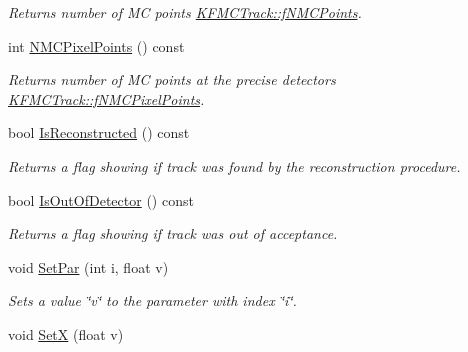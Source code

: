 \begin{DoxyCompactItemize}
\begin{DoxyCompactList}\small\item\em Returns number of MC points \hyperlink{classKFMCTrack_ac261323b51266d63d1bb6335e8428600}{K\+F\+M\+C\+Track\+::f\+N\+M\+C\+Points}. \end{DoxyCompactList}\item 
int \hyperlink{classKFMCTrack_a7ee66bc8a0c3db8f3adc6db3c28ae754}{N\+M\+C\+Pixel\+Points} () const \hypertarget{classKFMCTrack_a7ee66bc8a0c3db8f3adc6db3c28ae754}{}\label{classKFMCTrack_a7ee66bc8a0c3db8f3adc6db3c28ae754}

\begin{DoxyCompactList}\small\item\em Returns number of MC points at the precise detectors \hyperlink{classKFMCTrack_a7e91b033a3f0856258c0906ed5bcb293}{K\+F\+M\+C\+Track\+::f\+N\+M\+C\+Pixel\+Points}. \end{DoxyCompactList}\item 
bool \hyperlink{classKFMCTrack_a48f50e99c1ee75e0f800457528fe50aa}{Is\+Reconstructed} () const \hypertarget{classKFMCTrack_a48f50e99c1ee75e0f800457528fe50aa}{}\label{classKFMCTrack_a48f50e99c1ee75e0f800457528fe50aa}

\begin{DoxyCompactList}\small\item\em Returns a flag showing if track was found by the reconstruction procedure. \end{DoxyCompactList}\item 
bool \hyperlink{classKFMCTrack_a1269c7bd6cd60539a825e3b5a47e3d0f}{Is\+Out\+Of\+Detector} () const \hypertarget{classKFMCTrack_a1269c7bd6cd60539a825e3b5a47e3d0f}{}\label{classKFMCTrack_a1269c7bd6cd60539a825e3b5a47e3d0f}

\begin{DoxyCompactList}\small\item\em Returns a flag showing if track was out of acceptance. \end{DoxyCompactList}\item 
void \hyperlink{classKFMCTrack_adaf79bfed6d62b84dfcf47ccad7a3f44}{Set\+Par} (int i, float v)\hypertarget{classKFMCTrack_adaf79bfed6d62b84dfcf47ccad7a3f44}{}\label{classKFMCTrack_adaf79bfed6d62b84dfcf47ccad7a3f44}

\begin{DoxyCompactList}\small\item\em Sets a value \char`\"{}v\char`\"{} to the parameter with index \char`\"{}i\char`\"{}. \end{DoxyCompactList}\item 
void \hyperlink{classKFMCTrack_a6542e6870ea3135baf4276173af332a7}{SetX} (float v)\hypertarget{classKFMCTrack_a6542e6870ea3135baf4276173af332a7}{}\label{classKFMCTrack_a6542e6870ea3135baf4276173af332a7}


\end{DoxyCompactItemize}
